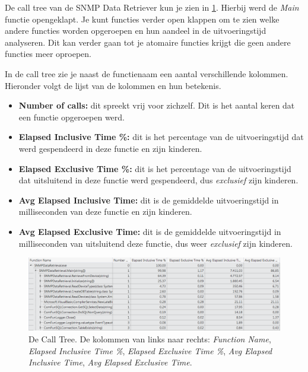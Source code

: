 De call tree van de SNMP Data Retriever kun je zien in \cref{call-tree}.
Hierbij werd de \emph{Main} functie opengeklapt. %
Je kunt functies verder open klappen om te zien welke andere functies worden opgeroepen en hun aandeel in de uitvoeringstijd analyseren.
Dit kan verder gaan tot je atomaire functies krijgt die geen andere functies meer oproepen.

In de call tree zie je naast de functienaam een aantal verschillende kolommen. Hieronder volgt de lijst van de kolommen en hun betekenis.

\begin{itemize}
	\item \textbf{Number of calls:}
		dit spreekt vrij voor zichzelf. Dit is het aantal keren dat een functie opgeroepen werd.
	\item \textbf{Elapsed Inclusive Time \%:}
		dit is het percentage van de uitvoeringstijd dat werd gespendeerd in deze functie en zijn kinderen.
	\item \textbf{Elapsed Exclusive Time \%:}
		dit is het percentage van de uitvoeringstijd dat uitsluitend in deze functie werd gespendeerd, dus \emph{exclusief} zijn kinderen.
	\item \textbf{Avg Elapsed Inclusive Time:}
		dit is de gemiddelde uitvoeringstijd in milliseconden van deze functie en zijn kinderen.
	\item \textbf{Avg Elapsed Exclusive Time:}
		dit is de gemiddelde uitvoeringstijd in milliseconden van uitsluitend deze functie, dus weer \emph{exclusief} zijn kinderen.
\end{itemize}

\begin{figure}[h]
	\centering
	\includegraphics[scale=0.50]{figures/profiler/call-tree}
	\caption[De Call Tree]{De Call Tree. De kolommen van links naar rechts:
		\emph{Function Name},
		\emph{Elapsed Inclusive Time \%},
		\emph{Elapsed Exclusive Time \%},
		\emph{Avg Elapsed Inclusive Time},
		\emph{Avg Elapsed Exclusive Time}.}
	\label{call-tree}
\end{figure}

